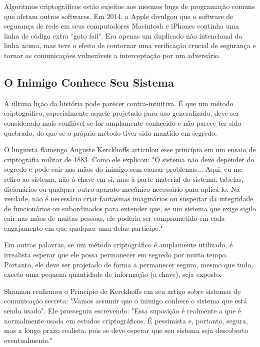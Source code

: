 \documentclass{book}
\begin{document}
Algoritmos criptográficos estão sujeitos aos mesmos bugs de programação comuns que afetam outros softwares. Em 2014, a Apple divulgou que o software de segurança de rede em seus computadores Macintosh e iPhones continha uma linha de código extra "goto fail". Era apenas um duplicado não intencional da linha acima, mas teve o efeito de contornar uma verificação crucial de segurança e tornar as comunicações vulneráveis a interceptação por um adversário.


\subsection{O Inimigo Conhece Seu Sistema}
\label{segredos:inimigo}

A última lição da história pode parecer contra-intuitiva. É que um método criptográfico, especialmente aquele projetado para uso generalizado, deve ser considerado mais confiável se for amplamente conhecido e não parece ter sido quebrado, do que se o próprio método tiver sido mantido em segredo.

O linguista flamengo Auguste Kerckhoffs articulou esse princípio em um ensaio de criptografia militar de 1883. Como ele explicou:
"O sistema não deve depender do segredo e pode cair nas mãos do inimigo sem causar problemas... Aqui, eu me refiro ao sistema, não à chave em si, mas à parte material do sistema: tabelas, dicionários ou qualquer outro aparato mecânico necessário para aplicá-lo. Na verdade, não é necessário criar fantasmas imaginários ou suspeitar da integridade de funcionários ou subordinados para entender que, se um sistema que exige sigilo cair nas mãos de muitas pessoas, ele poderia ser comprometido em cada engajamento em que qualquer uma delas participe."

Em outras palavras, se um método criptográfico é amplamente utilizado, é irrealista esperar que ele possa permanecer em segredo por muito tempo. Portanto, ele deve ser projetado de forma a permanecer seguro, mesmo que tudo, exceto uma pequena quantidade de informação (a chave), seja exposto.

Shannon reafirmou o Princípio de Kerckhoffs em seu artigo sobre sistemas de comunicação secreta: "Vamos assumir que o inimigo conhece o sistema que está sendo usado". Ele prosseguiu escrevendo:
"Essa suposição é realmente a que é normalmente usada em estudos criptográficos. É pessimista e, portanto, segura, mas a longo prazo realista, pois se deve esperar que seu sistema seja descoberto eventualmente."
\end{document}
